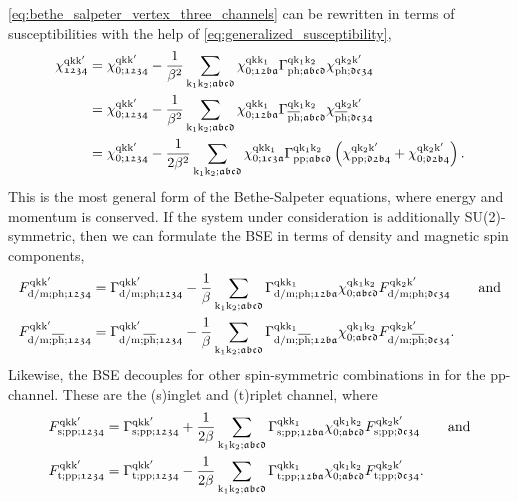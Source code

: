 \documentclass[../../main.tex]{subfiles}
\begin{document}
\eqref{eq:bethe_salpeter_vertex_three_channels} can be rewritten in terms of susceptibilities with the help of \eqref{eq:generalized_susceptibility},
\begin{subequations}\label{eq:bethe_salpeter_susc}
\begin{align}
	\chi^{\text{q}\text{k}\text{k}'}_{\mathfrak{1234}}&=\chi^{\text{q}\text{k}\text{k}'}_{0;\mathfrak{1234}}-\frac{1}{\beta^2}\sum_{\text{k}_1\text{k}_2;\mathfrak{abcd}}\chi^{\text{q}\text{k}\text{k}_1}_{0;\mathfrak{12ba}} \Gamma^{\text{q}\text{k}_1\text{k}_2}_{\text{ph};\mathfrak{abcd}} \chi^{\text{q}\text{k}_2\text{k}'}_{\text{ph};\mathfrak{dc34}}\\
	&=\chi^{\text{q}\text{k}\text{k}'}_{0;\mathfrak{1234}}-\frac{1}{\beta^2}\sum_{\text{k}_1\text{k}_2;\mathfrak{abcd}}\chi^{\text{q}\text{k}\text{k}_1}_{0;\mathfrak{12ba}} \Gamma^{\text{q}\text{k}_1\text{k}_2}_{\overline{\text{ph}};\mathfrak{abcd}} \chi^{\text{q}\text{k}_2\text{k}'}_{\overline{\text{ph}};\mathfrak{dc34}}\\
	&=\chi^{\text{q}\text{k}\text{k}'}_{0;\mathfrak{1234}}-\frac{1}{2\beta^2}\sum_{\text{k}_1\text{k}_2;\mathfrak{abcd}}\chi^{\text{q}\text{k}\text{k}_1}_{0;\mathfrak{1c3a}}\Gamma^{\text{q}\text{k}_1\text{k}_2}_{\text{pp};\mathfrak{abcd}}\left (\chi^{\text{q}\text{k}_2\text{k}'}_{\text{pp};\mathfrak{d2b4}}+\chi^{\text{q}\text{k}_2\text{k}'}_{0;\mathfrak{d2b4}}\right ).
\end{align}
\end{subequations}
This is the most general form of the Bethe-Salpeter equations, where energy and momentum is conserved. If the system under consideration is additionally SU(2)-symmetric, then we can formulate the BSE in terms of density and magnetic spin components,
\begin{subequations}
\begin{align}
	F_{\text{d}/\text{m};\text{ph};\mathfrak{1234}}^{\text{q}\text{k}\text{k}'}&=\Gamma_{\text{d}/\text{m};\text{ph};\mathfrak{1234}}^{\text{q}\text{k}\text{k}'}-\frac1\beta\sum_{\text{k}_1\text{k}_2;\mathfrak{abcd}} \Gamma_{\text{d}/\text{m};\text{ph};\mathfrak{12ba}}^{\text{q}\text{k}\text{k}_1} \chi_{0;\mathfrak{abcd}}^{\text{q}\text{k}_1\text{k}_2} F_{\text{d}/\text{m};\text{ph};\mathfrak{dc34}}^{\text{q}\text{k}_2\text{k}'}\qquad\text{and}\\
	F_{\text{d}/\text{m};\overline{\text{ph}};\mathfrak{1234}}^{\text{q}\text{k}\text{k}'}&=\Gamma_{\text{d}/\text{m};\overline{\text{ph}};\mathfrak{1234}}^{\text{q}\text{k}\text{k}'}-\frac1\beta\sum_{\text{k}_1\text{k}_2;\mathfrak{abcd}} \Gamma_{\text{d}/\text{m};\overline{\text{ph}};\mathfrak{12ba}}^{\text{q}\text{k}\text{k}_1} \chi_{0;\mathfrak{abcd}}^{\text{q}\text{k}_1\text{k}_2} F_{\text{d}/\text{m};\overline{\text{ph}};\mathfrak{dc34}}^{\text{q}\text{k}_2\text{k}'}.
\end{align}
\end{subequations}
Likewise, the BSE decouples for other spin-symmetric combinations in for the pp-channel. These are the (s)inglet and (t)riplet channel, where
\begin{align}
	F_{\text{s};\text{pp};\mathfrak{1234}}^{\text{q}\text{k}\text{k}'}&=\Gamma_{\text{s};\text{pp};\mathfrak{1234}}^{\text{q}\text{k}\text{k}'}+\frac{1}{2\beta}\sum_{\text{k}_1\text{k}_2;\mathfrak{abcd}} \Gamma_{\text{s};\text{pp};\mathfrak{12ba}}^{\text{q}\text{k}\text{k}_1} \chi_{0;\mathfrak{abcd}}^{\text{q}\text{k}_1\text{k}_2} F_{\text{s};\text{pp};\mathfrak{dc34}}^{\text{q}\text{k}_2\text{k}'}\qquad\text{and}\\
	F_{\text{t};\text{pp};\mathfrak{1234}}^{\text{q}\text{k}\text{k}'}&=\Gamma_{\text{t};\text{pp};\mathfrak{1234}}^{\text{q}\text{k}\text{k}'}-\frac{1}{2\beta}\sum_{\text{k}_1\text{k}_2;\mathfrak{abcd}} \Gamma_{\text{t};\text{pp};\mathfrak{12ba}}^{\text{q}\text{k}\text{k}_1} \chi_{0;\mathfrak{abcd}}^{\text{q}\text{k}_1\text{k}_2} F_{\text{t};\text{pp};\mathfrak{dc34}}^{\text{q}\text{k}_2\text{k}'}.
\end{align}
\end{document}
